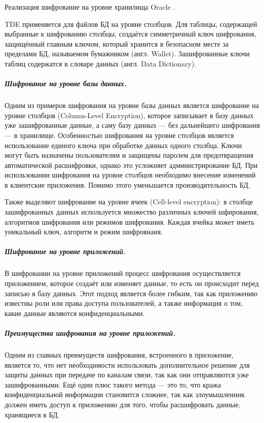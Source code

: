 Реализация шифрование на уровне хранилища Oracle \cite{Oracle-TDE}.

TDE применяется для файлов БД на уровне столбцов. Для таблицы, содержащей выбранные к шифрованию
столбцы, создаётся симметричный ключ шифрования, защищённый главным ключом, который хранится в
безопасном месте за пределами БД, называемом бумажником (англ. Wallet). Зашифрованные ключи таблиц
содержатся в словаре данных (англ. Data Dictionary). \\

\subparagraph{Шифрование на уровне базы данных.}
Одним из примеров шифрования на уровне базы данных является шифрование на уровне столбцов
(Column-Level Encryption), которое записывает в базу данных уже зашифрованные данные, а саму базу
данных — без дальнейшего шифрования — в хранилище. Особенностью шифрования на уровне столбцов
является использование единого ключа при обработке данных одного столбца. Ключи могут быть
назначены пользователям и защищены паролем для предотвращения автоматической расшифровки, однако
это усложняет администрирование БД\cite{IBM-CLE}. При использовании шифрования на уровне столбцов необходимо
внесение изменений в клиентские приложения. Помимо этого уменьшается производительность БД.

Также выделяют шифрование на уровне ячеек (Cell-level encryption):  в столбце зашифрованных данных используется множество различных ключей шфирования, алгоритмов шифрования или режимов шифрования. Каждая ячейка может иметь уникальный ключ, алгоритм и режим шифровнаия.\cite{IBM-CLE}

\subparagraph{Шифрование на уровне приложений.}
В шифровании на уровне приложений процесс шифрования осуществляется приложением, которое создаёт
или изменяет данные, то есть он происходит перед записью в базу данных. Этот подход является более
гибким, так как приложению известны роли или права доступа пользователей, а также информация о том,
какие данные являются конфиденциальными.

\subparagraph{Преимущества шифрования на уровне приложений.}

Одним из главных преимуществ шифрования, встроенного в приложение, является то, что нет
необходимости использовать дополнительное решение для защиты данных при передаче по каналам связи,
так как они отправляются уже зашифрованными. Ещё один плюс такого метода — это то, что кража
конфиденциальной информации становится сложнее, так как злоумышленник должен иметь доступ к
приложению для того, чтобы расшифровать данные, хранящиеся в БД.

